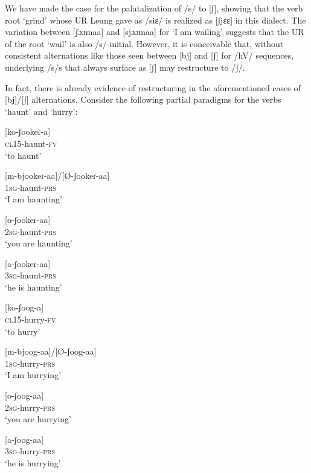 \documentclass[output=paper]{langsci/langscibook}
\begin{document}
We have made the case for the palatalization of /s/ to [ʃ], showing that the verb root ‘grind’ whose UR Leung gave as /siɛ/ is realized as [ʃjɛɛ] in this dialect. The variation between [ʃɔɔmaa] and [sjɔɔmaa] for ‘I am wailing’ suggests that the UR of the root ‘wail’ is also /s/-initial. However, it is conceivable that, without consistent alternations like those seen between [bj] and [ʃ] for /hV/ sequences, underlying /s/s that always surface as [ʃ] may restructure to /ʃ/. 

In fact, there is already evidence of restructuring in the aforementioned cases of [bj]/[ʃ] alternations. Consider the following partial paradigms for the verbs ‘haunt’ and ‘hurry’:


\ea\label{ex:glewwe:32}{}
   \ea\label{ex:glewwe:32a}
 [ko-ʃookeɾ-a]\\{}
\textsc{cl15}-haunt-\textsc{fv}\\{}
\glt ‘to haunt’

\ex\label{ex:glewwe:32b}{}
 [m-bjookeɾ-aa]/[Ø-ʃookeɾ-aa]\\{}
\textsc{1sg}-haunt-\textsc{prs}\\{}
\glt ‘I am haunting’


\ex\label{ex:glewwe:32c}{}
 [o-ʃookeɾ-aa]\\{}
\textsc{2sg}-haunt-\textsc{prs}\\{}
\glt ‘you are haunting’


\ex\label{ex:glewwe:32d}{}
 [a-ʃookeɾ-aa]\\{}
\textsc{3sg}-haunt-\textsc{prs}\\{}
\glt ‘he is haunting’

\ex\label{ex:glewwe:32e}{}
 [ko-ʃoog-a]\\{}
\textsc{cl15}-hurry-\textsc{fv}\\{}
\glt ‘to hurry’


\ex\label{ex:glewwe:32f}{}
 [m-bjoog-aa]/[Ø-ʃoog-aa]\\{}
\textsc{1sg}-hurry-\textsc{prs}\\{}
\glt ‘I am hurrying’

\ex\label{ex:glewwe:32g}{}
 [o-ʃoog-aa]\\{}
\textsc{2sg}-hurry-\textsc{prs}\\{}
\glt ‘you are hurrying’

\ex\label{ex:glewwe:32h}{}
 [a-ʃoog-aa]\\{}
\textsc{3sg}-hurry-\textsc{prs}\\{}
\glt ‘he is hurrying’
\z
\z 
\end{document}
